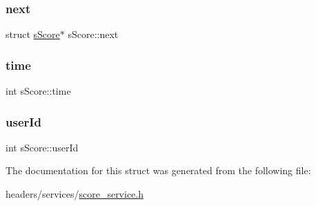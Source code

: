 \mbox{\label{structsScore_a0749a4e6f784bc84f1beb249b61fee2c}} 
\subsubsection{\texorpdfstring{next}{next}}
{\footnotesize\ttfamily struct \hyperlink{structsScore}{s\+Score}$\ast$ s\+Score\+::next}

\mbox{\label{structsScore_a30006da4a30926aab57200b3ade48ad3}} 
\subsubsection{\texorpdfstring{time}{time}}
{\footnotesize\ttfamily int s\+Score\+::time}

\mbox{\label{structsScore_ae792aee1311af8fff27d006ebd86988e}} 
\subsubsection{\texorpdfstring{user\+Id}{userId}}
{\footnotesize\ttfamily int s\+Score\+::user\+Id}



The documentation for this struct was generated from the following file\+:\begin{DoxyCompactItemize}
\item 
headers/services/\hyperlink{score__service_8h}{score\+\_\+service.\+h}\end{DoxyCompactItemize}
